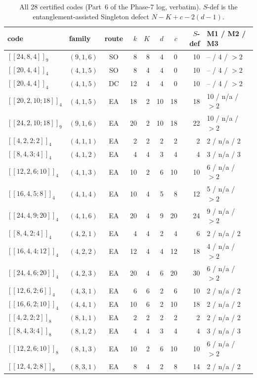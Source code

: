 \begin{table}[h]
\centering
\small
\caption{All $28$ certified codes (Part~6 of the Phase-7 log, verbatim).
$S$-def is the entanglement-assisted Singleton defect $N-K+c-2(d-1)$.}
\label{tab:cert}
\begin{tabular}{@{}llcrrrrrl@{}}
\toprule
code & family & route & $k$ & $K$ & $d$ & $c$
 & $S$-def & M1 / M2 / M3\\
\midrule
$[[24,8,4]]_9$   & $(9,1,6)$ & SO & 8  & 8  & 4  & 0  & 10 & -- / 4 / $>2$\\
$[[20,4,4]]_4$   & $(4,1,5)$ & SO & 8  & 4  & 4  & 0  & 10 & -- / 4 / $>2$\\
$[[20,4,4]]_4$   & $(4,1,5)$ & DC & 12 & 4  & 4  & 0  & 10 & -- / 4 / $>2$\\
$[[20,2,10;18]]_4$ & $(4,1,5)$ & EA & 18 & 2  & 10 & 18 & 18 & 10 / n/a / $>2$\\
$[[24,2,10;18]]_9$ & $(9,1,6)$ & EA & 20 & 2  & 10 & 18 & 22 & 10 / n/a / $>2$\\
$[[4,2,2;2]]_4$  & $(4,1,1)$ & EA & 2  & 2  & 2  & 2  & 2  & 2 / n/a / 2\\
$[[8,4,3;4]]_4$  & $(4,1,2)$ & EA & 4  & 4  & 3  & 4  & 4  & 3 / n/a / 3\\
$[[12,2,6;10]]_4$ & $(4,1,3)$ & EA & 10 & 2  & 6  & 10 & 10 & 6 / n/a / $>2$\\
$[[16,4,5;8]]_4$ & $(4,1,4)$ & EA & 10 & 4  & 5  & 8  & 12 & 5 / n/a / $>2$\\
$[[24,4,9;20]]_4$ & $(4,1,6)$ & EA & 20 & 4  & 9  & 20 & 24 & 9 / n/a / $>2$\\
$[[8,4,2;4]]_4$  & $(4,2,1)$ & EA & 4  & 4  & 2  & 4  & 6  & 2 / n/a / 2\\
$[[16,4,4;12]]_4$ & $(4,2,2)$ & EA & 12 & 4  & 4  & 12 & 18 & 4 / n/a / $>2$\\
$[[24,4,6;20]]_4$ & $(4,2,3)$ & EA & 20 & 4  & 6  & 20 & 30 & 6 / n/a / $>2$\\
$[[12,6,2;6]]_4$ & $(4,3,1)$ & EA & 6  & 6  & 2  & 6  & 10 & 2 / n/a / 2\\
$[[16,6,2;10]]_4$ & $(4,4,1)$ & EA & 10 & 6  & 2  & 10 & 18 & 2 / n/a / 2\\
$[[4,2,2;2]]_8$  & $(8,1,1)$ & EA & 2  & 2  & 2  & 2  & 2  & 2 / n/a / 2\\
$[[8,4,3;4]]_8$  & $(8,1,2)$ & EA & 4  & 4  & 3  & 4  & 4  & 3 / n/a / 3\\
$[[12,2,6;10]]_8$ & $(8,1,3)$ & EA & 10 & 2  & 6  & 10 & 10 & 6 / n/a / $>2$\\
$[[12,4,2;8]]_8$ & $(8,3,1)$ & EA & 8  & 4  & 2  & 8  & 14 & 2 / n/a / 2\\

\end{tabular}
\end{table}
